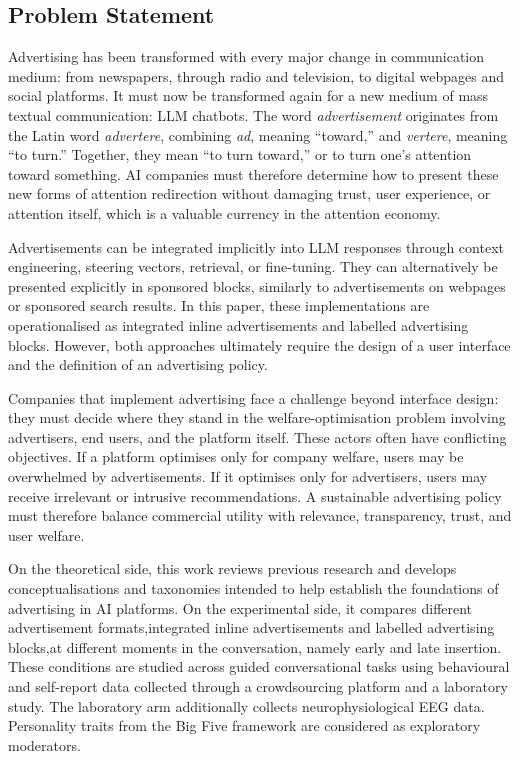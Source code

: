\documentclass[english]{article}
\begin{document}
\subsection{Problem Statement}
\label{subsec:problem-statement}

Advertising has been transformed with every major change in communication medium:
from newspapers, through radio and television, to digital webpages and social
platforms. It must now be transformed again for a new medium of mass textual
communication: LLM chatbots. The word \emph{advertisement} originates from the Latin
word \emph{advertere}, combining \emph{ad}, meaning ``toward,'' and
\emph{vertere}, meaning ``to turn.'' Together, they mean ``to turn toward,'' or to
turn one's attention toward something. AI companies must therefore determine how to
present these new forms of attention redirection without damaging trust, user
experience, or attention itself, which is a valuable currency in the attention
economy.

Advertisements can be integrated implicitly into LLM responses through context
engineering, steering vectors, retrieval, or fine-tuning. They can alternatively be
presented explicitly in sponsored blocks, similarly to advertisements on webpages
or sponsored search results. In this paper, these implementations are operationalised
as integrated inline advertisements and labelled advertising blocks. However, both
approaches ultimately require the design of a user interface and the definition of
an advertising policy.

Companies that implement advertising face a challenge beyond interface design:
they must decide where they stand in the welfare-optimisation problem involving
advertisers, end users, and the platform itself. These actors often have conflicting
objectives. If a platform optimises only for company welfare, users may be
overwhelmed by advertisements. If it optimises only for advertisers, users may
receive irrelevant or intrusive recommendations. A sustainable advertising policy
must therefore balance commercial utility with relevance, transparency, trust, and
user welfare.

On the theoretical side, this work reviews previous research and develops
conceptualisations and taxonomies intended to help establish the foundations of
advertising in AI platforms. On the experimental side, it compares different
advertisement formats,integrated inline advertisements and labelled advertising
blocks,at different moments in the conversation, namely early and late insertion.
These conditions are studied across guided conversational tasks using behavioural
and self-report data collected through a crowdsourcing platform and a laboratory
study. The laboratory arm additionally collects neurophysiological EEG data.
Personality traits from the Big Five framework are considered as exploratory
moderators.
\end{document}
